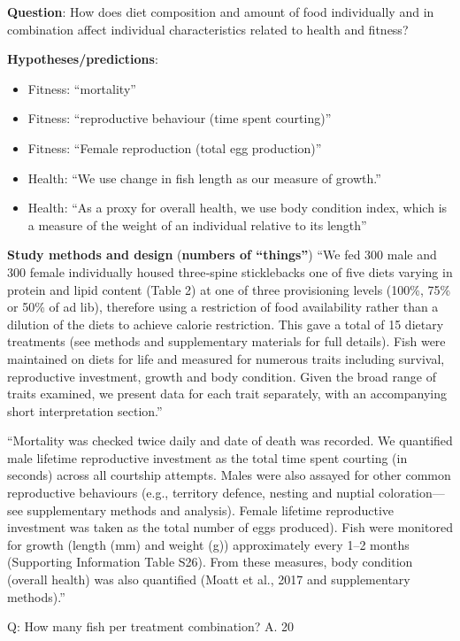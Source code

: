 \documentclass[]{book}
\providecommand{\tightlist}{%
  \setlength{\itemsep}{0pt}\setlength{\parskip}{0pt}}
\begin{document}
\textbf{Question}: How does diet composition and amount of food individually and in combination affect individual characteristics related to health and fitness?

\textbf{Hypotheses/predictions}:

\begin{itemize}
\tightlist
\item
  Fitness: ``mortality''
\item
  Fitness: ``reproductive behaviour (time spent courting)''
\item
  Fitness: ``Female reproduction (total egg production)''
\item
  Health: ``We use change in fish length as our measure of growth.''
\item
  Health: ``As a proxy for overall health, we use body condition index, which is a measure of the weight of an individual relative to its length''
\end{itemize}

\textbf{Study methods and design} (\textbf{numbers of ``things''}) ``We fed 300 male and 300 female individually housed three‐spine sticklebacks one of five diets varying in protein and lipid content (Table 2) at one of three provisioning levels (100\%, 75\% or 50\% of ad lib), therefore using a restriction of food availability rather than a dilution of the diets to achieve calorie restriction. This gave a total of 15 dietary treatments (see methods and supplementary materials for full details). Fish were maintained on diets for life and measured for numerous traits including survival, reproductive investment, growth and body condition. Given the broad range of traits examined, we present data for each trait separately, with an accompanying short interpretation section.''

``Mortality was checked twice daily and date of death was recorded. We quantified male lifetime reproductive investment as the total time spent courting (in seconds) across all courtship attempts. Males were also assayed for other common reproductive behaviours (e.g., territory defence, nesting and nuptial coloration---see supplementary methods and analysis). Female lifetime reproductive investment was taken as the total number of eggs produced). Fish were monitored for growth (length (mm) and weight (g)) approximately every 1--2 months (Supporting Information Table S26). From these measures, body condition (overall health) was also quantified (Moatt et al., 2017 and supplementary methods).''

Q: How many fish per treatment combination? A. 20
\end{document}
